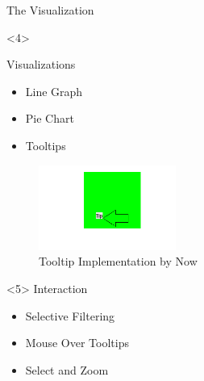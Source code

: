 \documentclass{beamer}
\begin{document}
\begin{frame}{The Visualization}
\begin{onlyenv}<4>
\begin{minipage}[hbt]{0.45\textwidth}
Visualizations
\begin{itemize}
\item Line Graph
\item Pie Chart
\item Tooltips
\end{itemize}
\end{minipage}
\begin{minipage}[hbt]{0.45\textwidth}
	\begin{figure}
	\centering
	\includegraphics[width=4.5cm]{tip.png}
	\caption{Tooltip Implementation by Now}
	\end{figure}
\end{minipage}
\end{onlyenv}

\begin{onlyenv}<5>
Interaction
\begin{itemize}
\item Selective Filtering
\item Mouse Over Tooltips
\item Select and Zoom
\end{itemize}
\end{onlyenv}
\end{frame}
\end{document}
